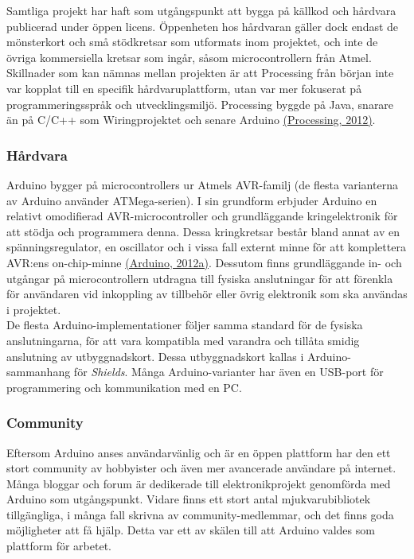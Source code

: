 \documentclass[a4paper,11pt]{article}
\begin{document}
Samtliga projekt har haft som utgångspunkt att bygga på källkod och hårdvara publicerad under öppen licens. Öppenheten hos hårdvaran gäller dock endast de mönsterkort och små stödkretsar som utformats inom projektet, och inte de övriga kommersiella kretsar som ingår, såsom microcontrollern från Atmel. Skillnader  som kan nämnas mellan projekten är att Processing från början inte var kopplat till en specifik hårdvaruplattform, utan var mer fokuserat på programmeringsspråk och utvecklingsmiljö. Processing byggde på Java, snarare än på C/C++ som Wiringprojektet och senare Arduino \hyperref[processing]{(Processing, 2012)}.

\subsubsection{Hårdvara}
Arduino bygger på microcontrollers ur Atmels AVR-familj (de flesta varianterna av Arduino använder ATMega-serien). I sin grundform erbjuder Arduino en relativt omodifierad AVR-microcontroller och grundläggande kringelektronik för att stödja och programmera denna. Dessa kringkretsar består bland annat av en spänningsregulator, en oscillator och i vissa fall externt minne för att komplettera AVR:ens on-chip-minne \hyperref[arduino]{(Arduino, 2012a)}. Dessutom finns grundläggande in- och utgångar på microcontrollern utdragna till fysiska anslutningar för att förenkla för användaren vid inkoppling av tillbehör eller övrig elektronik som ska användas i projektet. \\

De flesta Arduino-implementationer följer samma standard för de fysiska anslutningarna, för att vara kompatibla med varandra och tillåta smidig anslutning av utbyggnadskort. Dessa utbyggnadskort kallas i Arduino-sammanhang för {\it Shields}. Många Arduino-varianter har även en USB-port för programmering och kommunikation med en PC. 

\subsubsection{Community}
Eftersom Arduino anses användarvänlig och är en öppen plattform har den ett stort community av hobbyister och även mer avancerade användare på internet. Många bloggar och forum är dedikerade till elektronikprojekt genomförda med Arduino som utgångspunkt. Vidare finns ett stort antal mjukvarubibliotek tillgängliga, i många fall skrivna av community-medlemmar, och det finns goda möjligheter att få hjälp. Detta var ett av skälen till att Arduino valdes som plattform för arbetet. \\
\end{document}
